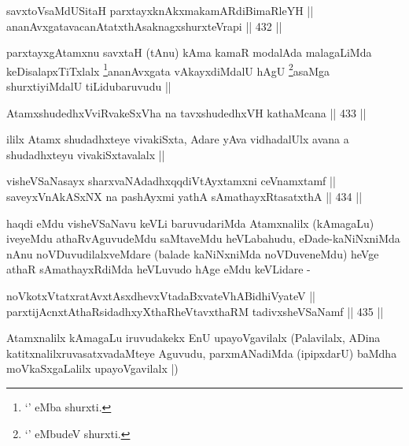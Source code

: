 \begin{shl}
savxtoV\s saMdUSitaH parxtayxknAkxmakamARdiBimaRleYH || \\
ananAvxgatavacanAtatxthA\s saknagxshurxteVrapi ||  432 ||  
\end{shl}

\begin{artha}
parxtayxgAtamxnu savxtaH (tAnu) kAma kamaR modalAda malagaLiMda
keDisalapxTiTxlalx \footnote{`\stext' eMba shurxti.}ananAvxgata vAkayxdiMdalU
hAgU \footnote{`\stext' eMbudeV shurxti.}asaMga shurxtiyiMdalU tiLidubaruvudu ||
\end{artha}


\begin{shl}
AtamxshudedhxVviRvakeSxVha na tavxshudedhxVH kathaMcana ||  433 ||
\end{shl}

\begin{artha}
ililx Atamx shudadhxteye vivakiSxta, Adare yAva vidhadalUlx avana a
shudadhxteyu vivakiSxtavalalx ||
\end{artha}


\begin{shl}
visheVSaNasayx sharxvaNAdadhxqqdiVtAyxtamxni ceVnamxtamf || \\
saveyxVnAkASxNX na pashAyxmi yathA sAmathayxRtasatxthA ||  434 ||  
\end{shl}

\begin{artha}
haqdi eMdu visheVSaNavu keVLi baruvudariMda Atamxnalilx
(kAmagaLu) iveyeMdu athaRvAguvudeMdu saMtaveMdu heVLabahudu,
eDade-kaNiNxniMda nAnu noVDuvudilalxveMdare (balade kaNiNxniMda
noVDuveneMdu) heVge athaR sAmathayxRdiMda heVLuvudo hAge eMdu
keVLidare -
\end{artha}


\begin{shl}
noVkotxVtatxratAvxtAsxdhevxVtadaBxvateVhABidhiVyateV || \\
parxtijAcnxtAthaRsidadhxyXthaRheVtavxthaRM tadivxsheVSaNamf ||  435 ||  
\end{shl}

\begin{artha}
Atamxnalilx kAmagaLu iruvudakekx EnU upayoVgavilalx (Palavilalx, ADina
katitxnalilxruvasatxvadaMteye Aguvudu, parxmANadiMda (ipipxdarU)
baMdha moVkaSxgaLalilx upayoVgavilalx |)
\end{artha}

